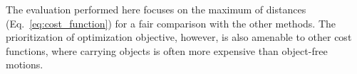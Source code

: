
The evaluation performed here focuses on the maximum of distances (Eq.~\ref{eq:cost_function}) for a fair comparison with the other methods. The prioritization of optimization objective, however, is also amenable to other cost functions, where carrying objects is often more expensive than object-free motions. 
